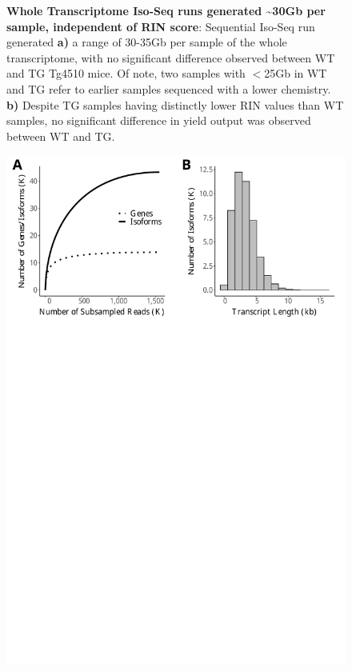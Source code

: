 \begin{figure}[htp]
	\captionsetup{width=0.95\textwidth}
	\caption[Whole Transcriptome Iso-Seq run yields and relationship to RIN score]%
	{\textbf{Whole Transcriptome Iso-Seq runs generated \textasciitilde30Gb per sample, independent of RIN score}: Sequential Iso-Seq run generated \textbf{a)} a range of 30-35Gb per sample of the whole transcriptome, with no significant difference observed between WT and TG Tg4510 mice. Of note, two samples with $<$25Gb in WT and TG refer to earlier samples sequenced with a lower chemistry. \textbf{b)} Despite TG samples having distinctly lower RIN values than WT samples, no significant difference in yield output was observed between WT and TG.}
	\label{fig:isoseq_whole_lengths}
\end{figure}

\begin{figure}[htp]
	\begin{center}
		\includegraphics[page=2,scale = 0.55]{Figures/IsoSeqWholeTranscriptome.pdf}

\end{center}
\end{figure}
